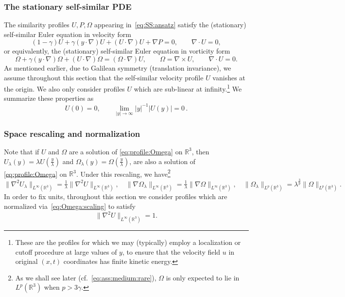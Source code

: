 \documentclass[10pt,a4paper]{amsart}
\theoremstyle{plain}
\theoremstyle{remark}
\begin{document}
\subsubsection{The stationary self-similar PDE}
The similarity profiles $U,P,\Omega$ appearing in~\eqref{eq:SS:ansatz} satisfy the (stationary) self-similar Euler equation in velocity form
\begin{equation}
(1-\gamma) U + \gamma (y \cdot \nabla) U + (U \cdot \nabla) U + \nabla P = 0,
\qquad 
\nabla \cdot U = 0 ,
\label{eq:profile:U}
\end{equation}
or equivalently, the (stationary) self-similar Euler equation in vorticity form
\begin{equation}
\Omega + \gamma (y \cdot \nabla) \Omega + (U \cdot \nabla) \Omega = (\Omega \cdot \nabla) U
,
\qquad 
\Omega = \nabla \times U
,
\qquad 
\nabla \cdot U = 0 .
\label{eq:profile:Omega}
\end{equation}
As mentioned earlier, due to Galilean symmetry (translation invariance), we assume throughout this section that the self-similar velocity profile $U$ vanishes at the origin. We also only consider profiles $U$ which are sub-linear at infinity.\footnote{
These are the profiles for which we may (typically) employ a localization or cutoff  procedure at
large values of $y$, to ensure that the velocity field $u$ in original $(x,t)$ coordinates has finite kinetic energy.}
We summarize these properties as
\begin{equation}
U(0) = 0,
\qquad
\lim_{|y|\to \infty} |y|^{-1} |U(y)| = 0 \,.
\label{eq:U:non:negotiable} 
\end{equation}

\subsubsection{Space rescaling and normalization}
Note that if $U$ and $\Omega$ are a solution of \eqref{eq:profile:Omega} on $\mathbb{R}^3$, then   
$U_{\lambda}(y)= \lambda U(\tfrac{y}{\lambda})$ and $\Omega_{\lambda}(y) =  \Omega(\tfrac{y}{\lambda})$, 
are also a solution of \eqref{eq:profile:Omega} on $\mathbb{R}^3$.
Under this rescaling, we have\footnote{As we shall see later (cf.~\eqref{eq:ass:medium:rare}), $\Omega$ is only expected to lie in $L^p(\mathbb{R}^3)$ when $p > 3 \gamma$.} 
\begin{equation}
\|\nabla^2 U_\lambda\|_{L^\infty(\mathbb{R}^3)}
= \tfrac{1}{\lambda} \|\nabla^2 U\|_{L^\infty(\mathbb{R}^3)}
,\quad
\|\nabla \Omega_\lambda\|_{L^\infty(\mathbb{R}^3)}    
= \tfrac{1}{\lambda}  \|\nabla \Omega\|_{L^\infty(\mathbb{R}^3)}    
,\quad 
\| \Omega_\lambda\|_{L^p(\mathbb{R}^3)}    
=  \lambda^{\frac{3}{p}} \|\Omega\|_{L^p(\mathbb{R}^3)}   
.
\label{eq:Omega:scaling}
\end{equation}
In order to fix units, throughout this section we consider profiles which are normalized via~\eqref{eq:Omega:scaling} to satisfy
\begin{equation}
\| \nabla^2 U \|_{L^\infty(\mathbb{R}^3)}  = 1 .
\label{eq:U:scaling} 
\end{equation}
\end{document}
